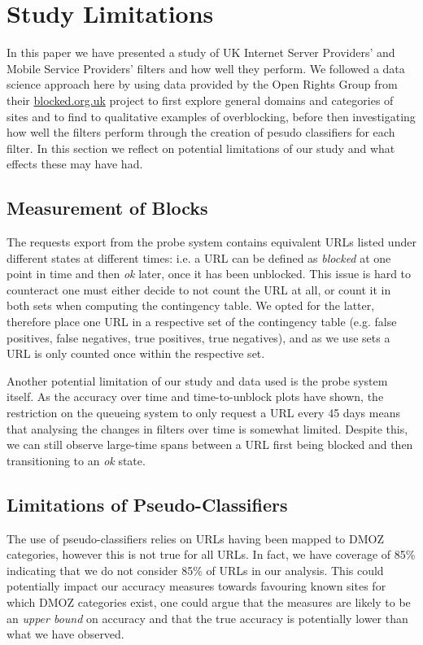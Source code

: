 \documentclass{bmcart}
\begin{document}
\section*{Study Limitations}
In this paper we have presented a study of UK Internet Server Providers' and Mobile Service Providers' filters and how well they perform.
We followed a data science approach here by using data provided by the Open Rights Group from their \url{blocked.org.uk} project to first explore general domains and categories of sites and to find to qualitative examples of overblocking, before then investigating how well the filters perform through the creation of pesudo classifiers for each filter.
In this section we reflect on potential limitations of our study and what effects these may have had.

\subsection*{Measurement of Blocks}
The requests export from the probe system contains equivalent URLs listed under different states at different times: i.e. a URL can be defined as \textit{blocked} at one point in time and then \textit{ok} later, once it has been unblocked.
This issue is hard to counteract one must either decide to not count the URL at all, or count it in both sets when computing the contingency table.
We opted for the latter, therefore place one URL in a respective set of the contingency table (e.g. false positives, false negatives, true positives, true negatives), and as we use sets a URL is only counted once within the respective set.

Another potential limitation of our study and data used is the probe system itself. 
As the accuracy over time and time-to-unblock plots have shown, the restriction on the queueing system to only request a URL every 45 days means that analysing the changes in filters over time is somewhat limited.
Despite this, we can still observe large-time spans between a URL first being blocked and then transitioning to an \textit{ok} state.

\subsection*{Limitations of Pseudo-Classifiers}
The use of pseudo-classifiers relies on URLs having been mapped to DMOZ categories, however this is not true for all URLs.
In fact, we have coverage of 85\% indicating that we do not consider 85\% of URLs in our analysis.
This could potentially impact our accuracy measures towards favouring known sites for which DMOZ categories exist, one could argue that the measures are likely to be an \textit{upper bound} on accuracy and that the true accuracy is potentially lower than what we have observed.
\end{document}
